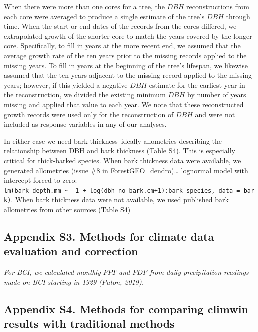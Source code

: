 \documentclass[
]{article}
\begin{document}
When there were more than one cores for a tree, the \(DBH\)
reconstructions from each core were averaged to produce a single
estimate of the tree's \(DBH\) through time. When the start or end dates
of the records from the cores differed, we extrapolated growth of the
shorter core to match the years covered by the longer core.
Specifically, to fill in years at the more recent end, we assumed that
the average growth rate of the ten years prior to the missing records
applied to the missing years. To fill in years at the beginning of the
tree's lifespan, we likewise assumed that the ten years adjacent to the
missing record applied to the missing years; however, if this yielded a
negative \(DBH\) estimate for the earliest year in the reconstruction,
we divided the existing minimum \(DBH\) by number of years missing and
applied that value to each year. We note that these reconstructed growth
records were used only for the reconstruction of \(DBH\) and were not
included as response variables in any of our analyses.

In either case we need bark thickness--ideally allometries describing
the relationship between DBH and bark thickness (Table S4). This is
especially critical for thick-barked species. When bark thickness data
were available, we generated allometries
(\href{https://github.com/EcoClimLab/ForestGEO_dendro/issues/8}{issue
\#8 in ForestGEO\_dendro})\ldots{} lognormal model with intercept forced
to zero:
\texttt{lm(bark\_depth.mm\ \textasciitilde{}\ -1\ +\ log(dbh\_no\_bark.cm+1):bark\_species,\ data\ =\ bark)}.
When bark thickness data were not available, we used published bark
allometries from other sources (Table S4)

\newpage

\hypertarget{appendix-s3.-methods-for-climate-data-evaluation-and-correction}{%
\subsection{Appendix S3. Methods for climate data evaluation and
correction}\label{appendix-s3.-methods-for-climate-data-evaluation-and-correction}}

\emph{For BCI, we calculated monthly \(PPT\) and \(PDF\) from daily
precipitation readings made on BCI starting in 1929 (Paton, 2019).}

\newpage

\hypertarget{appendix-s4.-methods-for-comparing-climwin-results-with-traditional-methods}{%
\subsection{Appendix S4. Methods for comparing climwin results with
traditional
methods}\label{appendix-s4.-methods-for-comparing-climwin-results-with-traditional-methods}}
\end{document}
